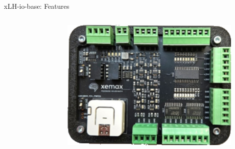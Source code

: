 \documentclass[10pt]{beamer}
\begin{document}
            \begin{frame}{xLH-io-base: Features}
                \begin{columns}
                    \begin{column}{0.75\textwidth}
                        
                    \end{column}
                    \begin{column}{0.25\textwidth}
                        \begin{figure}[h]
                            \centering
                            \includegraphics[width=1.0\textwidth]{graphics/xLH-io-base}
                        \end{figure}
                    \end{column}
                \end{columns}
            \end{frame}
\end{document}
